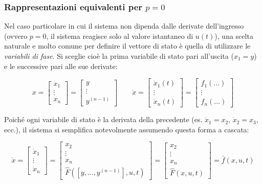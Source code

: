 \documentclass[a4paper,12pt]{article}
\begin{document}
	\subsubsection{Rappresentazioni equivalenti per $p = 0$}
	
	Nel caso particolare in cui il sistema non dipenda dalle derivate dell'ingresso (ovvero $p = 0$, il sistema reagisce solo al valore istantaneo di $u(t)$), una scelta naturale e molto comune per definire il vettore di stato è quella di utilizzare le \textit{variabili di fase}. Si sceglie cioè la prima variabile di stato pari all'uscita ($x_1 = y$) e le successive pari alle sue derivate:
	
	\[
	x = 
	\begin{bmatrix} 
		x_1 \\ 
		\vdots \\ 
		x_n 
	\end{bmatrix} 
	= 
	\begin{bmatrix} 
		y \\ 
		\vdots \\ 
		y^{(n-1)} 
	\end{bmatrix} 
	\qquad 
	\dot{x} = 
	\begin{bmatrix} 
		\dot{x}_1(t) \\ 
		\vdots \\ 
		\dot{x}_n(t) 
	\end{bmatrix} 
	= 
	\begin{bmatrix} 
		f_1(\dots) \\ 
		\vdots \\ 
		f_n(\dots) 
	\end{bmatrix}
	\]
	
	Poiché ogni variabile di stato è la derivata della precedente (es. $\dot{x}_1 = x_2$, $\dot{x}_2 = x_3$, ecc.), il sistema si semplifica notevolmente assumendo questa forma a cascata:
	
	\[
	\dot{x} = 
	\begin{bmatrix} 
		\dot{x}_1 \\ 
		\vdots \\ 
		\dot{x}_n 
	\end{bmatrix} 
	= 
	\begin{bmatrix} 
		x_2 \\ 
		\vdots \\ 
		x_n \\ 
		\hat{F}([y, \dots, y^{(n-1)}], u, t) 
	\end{bmatrix} 
	= 
	\begin{bmatrix} 
		x_2 \\ 
		\vdots \\ 
		x_n \\ 
		\hat{F}(x, u, t) 
	\end{bmatrix} 
	= \bar{f}(x, u, t)
	\]
	
\end{document}
